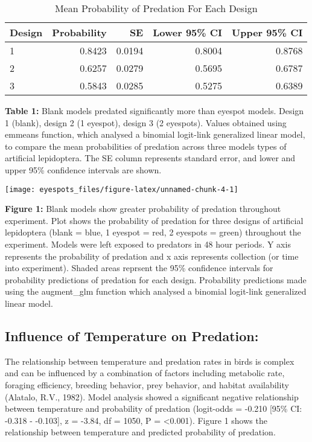 \documentclass[
]{article}
\begin{document}
\begin{table}[H]
\centering
\caption{\label{tab:unnamed-chunk-2}Mean Probability of Predation For Each Design}
\fontsize{12}{14}\selectfont
\begin{tabular}[t]{lrrrr}
\toprule
Design & Probability & SE & Lower 95\% CI & Upper 95\% CI\\
\midrule
1 & 0.8423 & 0.0194 & 0.8004 & 0.8768\\
2 & 0.6257 & 0.0279 & 0.5695 & 0.6787\\
3 & 0.5843 & 0.0285 & 0.5275 & 0.6389\\
\bottomrule
\end{tabular}
\end{table}

\textbf{Table 1:} Blank models predated significantly more than eyespot
models. Design 1 (blank), design 2 (1 eyespot), design 3 (2 eyespots).
Values obtained using emmeans function, which analysed a binomial
logit-link generalized linear model, to compare the mean probabilities
of predation across three models types of artificial lepidoptera. The SE
column represents standard error, and lower and upper 95\% confidence
intervals are shown.

\begin{center}\texttt{[image: eyespots\_files/figure-latex/unnamed-chunk-4-1]} \end{center}

\textbf{Figure 1:} Blank models show greater probability of predation
throughout experiment. Plot shows the probability of predation for three
designs of artificial lepidoptera (blank = blue, 1 eyespot = red, 2
eyespots = green) throughout the experiment. Models were left exposed to
predators in 48 hour periods. Y axis represents the probability of
predation and x axis represents collection (or time into experiment).
Shaded areas reprsent the 95\% confidence intervals for probability
predictions of predation for each design. Probability predictions made
using the augment\_glm function which analysed a binomial logit-link
generalized linear model.

\hypertarget{influence-of-temperature-on-predation}{%
\subsection{Influence of Temperature on
Predation:}\label{influence-of-temperature-on-predation}}

The relationship between temperature and predation rates in birds is
complex and can be influenced by a combination of factors including
metabolic rate, foraging efficiency, breeding behavior, prey behavior,
and habitat availability (Alatalo, R.V., 1982). Model analysis showed a
significant negative relationship between temperature and probability of
predation (logit-odds = -0.210 {[}95\% CI: -0.318 - -0.103{]}, z =
-3.84, df = 1050, P = \textless0.001). Figure 1 shows the relationship
between temperature and predicted probability of predation.
\end{document}
